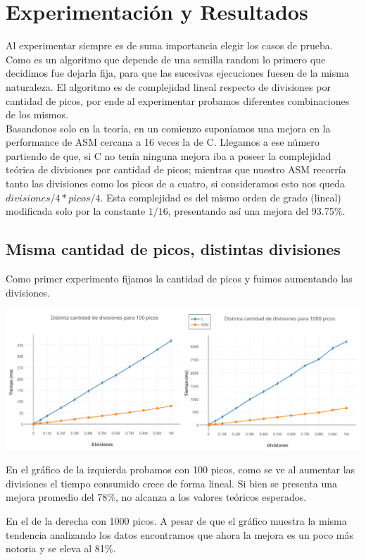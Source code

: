 \section{Experimentación y Resultados}

Al experimentar siempre es de suma importancia elegir los casos de prueba. Como es un algoritmo que depende de una semilla random lo primero que decidimos fue dejarla fija, para que las sucesivas ejecuciones fuesen de la misma naturaleza. El algoritmo es de complejidad lineal respecto de divisiones por cantidad de picos, por ende al experimentar probamos diferentes combinaciones de los mismos.\\

Basandonos solo en la teoría, en un comienzo suponíamos una mejora en la performance de ASM cercana a 16 veces la de C. Llegamos a ese número partiendo de que, si C no tenía ninguna mejora iba a poseer la complejidad teórica de divisiones por cantidad de picos; mientras que nuestro ASM recorría tanto las divisiones como los picos de a cuatro, si consideramos esto nos queda $divisiones/4 * picos/4$. Esta complejidad es del mismo orden de grado (lineal) modificada solo por la constante $1/16$, presentando así una mejora del 93.75$\%$.

\subsection{Misma cantidad de picos, distintas divisiones}
Como primer experimento fijamos la cantidad de picos y fuimos aumentando las divisiones.

\centerline{\includegraphics[scale=0.45]{imagenes/distintasDivisionesParaPicos.png}}

En el gráfico de la izquierda probamos con 100 picos, como se ve al aumentar las divisiones el tiempo consumido crece de forma lineal. Si bien se presenta una mejora promedio del 78$\%$, no alcanza a los valores teóricos esperados.

En el de la derecha con 1000 picos. A pesar de que el gráfico muestra la misma tendencia analizando los datos encontramos que ahora la mejora es un poco más notoria y se eleva al 81$\%$.

